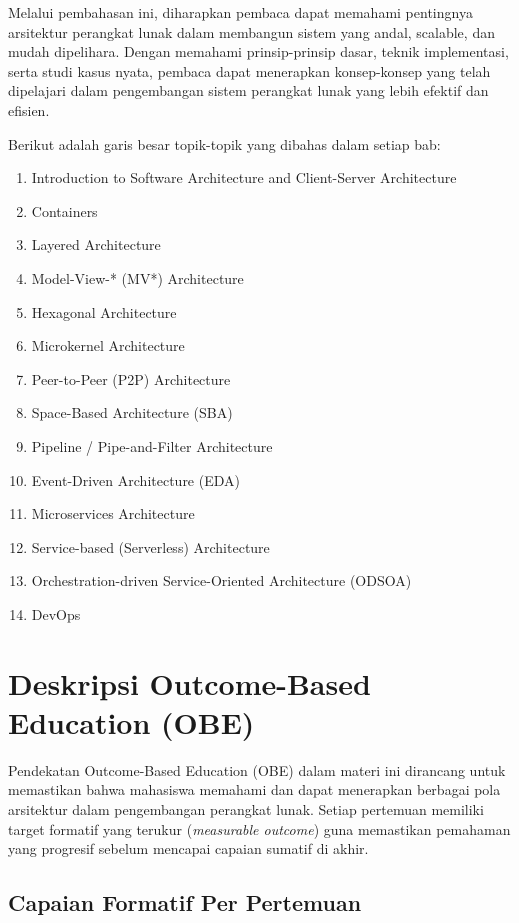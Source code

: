 Melalui pembahasan ini, diharapkan pembaca dapat memahami pentingnya arsitektur perangkat lunak dalam membangun sistem yang andal, scalable, dan mudah dipelihara. Dengan memahami prinsip-prinsip dasar, teknik implementasi, serta studi kasus nyata, pembaca dapat menerapkan konsep-konsep yang telah dipelajari dalam pengembangan sistem perangkat lunak yang lebih efektif dan efisien.

Berikut adalah garis besar topik-topik yang dibahas dalam setiap bab:
\begin{enumerate}
\item Introduction to Software Architecture and Client-Server Architecture
\item Containers
\item Layered Architecture
\item Model-View-* (MV*) Architecture
\item Hexagonal Architecture
\item Microkernel Architecture
\item Peer-to-Peer (P2P) Architecture

\item Space-Based Architecture (SBA)
\item Pipeline / Pipe-and-Filter Architecture
\item Event-Driven Architecture (EDA)
\item Microservices Architecture
\item Service-based (Serverless) Architecture
\item Orchestration-driven Service-Oriented Architecture (ODSOA)
\item DevOps
\end{enumerate}


\section{Deskripsi Outcome-Based Education (OBE)}

Pendekatan Outcome-Based Education (OBE) dalam materi ini dirancang untuk memastikan bahwa mahasiswa memahami dan dapat menerapkan berbagai pola arsitektur dalam pengembangan perangkat lunak. Setiap pertemuan memiliki target formatif yang terukur (\textit{measurable outcome}) guna memastikan pemahaman yang progresif sebelum mencapai capaian sumatif di akhir.

\subsection{Capaian Formatif Per Pertemuan}

